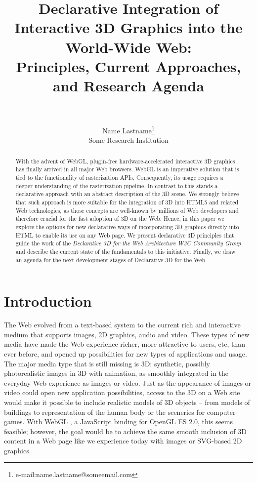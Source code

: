 \documentclass[review]{acmsiggraph}
\title{Declarative Integration of Interactive 3D Graphics into the World-Wide Web:\\Principles, Current Approaches, and Research Agenda
\\~} %
\author{Name Lastname\thanks{e-mail:name.lastname@someemail.com}\\Some Research Institution}
\begin{document}
\maketitle

\begin{abstract}
With the advent of WebGL, plugin-free hardware-accelerated interactive 3D graphics has finally arrived in all major Web browsers.
WebGL is an imperative solution that is tied to the functionality of rasterization APIs. Consequently, its usage requires a deeper understanding of the rasterization pipeline. In contrast to this stands a declarative approach with an abstract description of the 3D scene. We strongly believe that such approach is more suitable for the integration of 3D into HTML5 and related Web technologies, as those concepts are well-known by millions of Web developers and therefore crucial for the fast adoption of 3D on the Web.%
Hence, in this paper we explore the options for new declarative ways of incorporating 3D graphics directly into HTML to enable its use on any Web page. We present declarative 3D principles that guide the work of the \textit{Declarative 3D for the Web Architecture W3C Community Group} and describe the current state of the fundamentals to this initiative. Finally, we draw an agenda for the next development stages of Declarative 3D for the Web.
\end{abstract}

\begin{CRcatlist}
\end{CRcatlist}

\keywordlist
\copyrightspace


\section{Introduction}

The Web evolved from a text-based system to the current rich and interactive medium that supports images, 2D graphics, audio and video. These types of new media have made the Web experience richer, more attractive to users, etc, than ever before, and opened up possibilities for new types of applications and usage. The major media type that is still missing is 3D: synthetic, possibly photorealistic images in 3D with animation, as smoothly integrated in the everyday Web experience as images or video. Just as the appearance of images or video could open new application possibilities, access to the 3D on a Web site would make it possible to include realistic models of 3D objects -- from models of buildings to representation of the human body or the sceneries for computer games. With WebGL \cite{WebGL12}, a JavaScript binding for OpenGL ES 2.0, this seems feasible; however, the goal would be to achieve the same smooth inclusion of 3D content in a Web page like we experience today with images or SVG-based 2D graphics.
\end{document}

